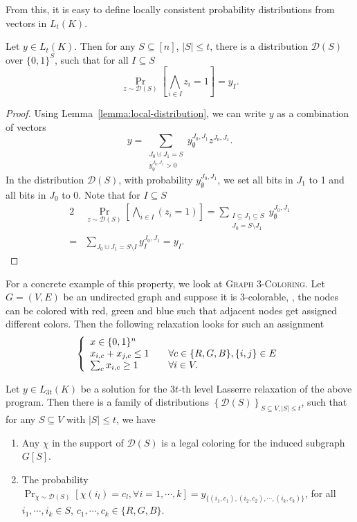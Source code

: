 \documentclass[a4paper,twoside,justified]{tufte-handout}
\begin{document}
From this, it is easy to define locally consistent probability distributions from vectors in $L_t(K)$.
\begin{theorem}
  Let $y \in L_t(K)$. Then for any $S \subseteq [n]$, $|S| \le t$, there is a distribution $\mathscr{D}(S)$ over
  $\{0,1\}^S$, such that for all $I \subseteq S$
  \[
  \Pr_{z \sim \mathscr{D}(S)}\left[ \bigwedge_{i \in I} z_i=1 \right] = y_I.
  \]
\end{theorem}
\begin{proof}
  Using Lemma~\ref{lemma:local-distribution}, we can write $y$ as a combination of vectors
  \[
  y = \sum_{\substack{J_0 \cupdot J_1=S \\ y^{J_0,J_1}_{\emptyset}>0}} y^{J_0,J_1}_{\emptyset} z^{J_0,J_1}.
  \]
  In the distribution $\mathscr{D}(S)$, with probability $y^{J_0,J_1}_{\emptyset}$, we set all bits in $J_1$ to 1 and
  all bits in $J_0$ to 0. Note that for $I \subseteq S$
  \begin{alignat*}{2}
    & \Pr_{z \sim \mathscr{D}(S)}\left[ \bigwedge_{i \in I} (z_i=1) \right] 
    = \sum_{\substack{I \subseteq J_1 \subseteq S \\ J_0=S \setminus J_1}} y^{J_0,J_1}_{\emptyset} \\
    =& \sum_{J_0 \cupdot J_1 = S \setminus I} y^{J_0,J_1}_{I} = y_I.
  \end{alignat*}
\end{proof}

For a concrete example of this property, we look at \textsc{Graph 3-Coloring}. Let $G=(V,E)$ be an undirected graph
and suppose it is 3-colorable, \ie, the nodes can be colored with red, green and blue such that adjacent
nodes get assigned different colors. Then the following relaxation looks for such an assignment
\[
\left\{
\begin{array}{l l}
  x \in \{0,1\}^n \\
  x_{i,c}+x_{j,c} \le 1 & \quad \forall c \in \{R,G,B\}, \{i,j\} \in E \\
  \sum_{c} x_{i,c} \ge 1 & \quad \forall i \in V.
\end{array}
\right.
\]
\begin{lemma}
  Let $y \in L_{3t}(K)$ be a solution for the $3t$-th level Lasserre relaxation of the above program. 
  Then there is a family of distributions $\left\{ \mathscr{D}(S) \right\}_{S \subseteq V, |S| \le t}$, such that for any
  $S \subseteq V$ with $|S| \le t$, we have
  \begin{enumerate}
    \item Any $\chi$ in the support of $\mathscr{D}(S)$ is a legal coloring for the induced subgraph $G[S]$.
    \item The probability $\Pr_{\chi \sim \mathscr{D}(S)}[\chi(i_l)=c_l, \forall i=1,\cdots,k] = y_{\{(i_1,c_1),(i_2,c_2),\cdots,(i_k,c_k)\}}$,
      for all $i_1,\cdots,i_k \in S$, $c_1,\cdots,c_k \in \{R,G,B\}$.
  \end{enumerate}
\end{lemma}

\end{document}
